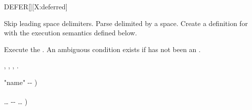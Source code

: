 \begin{worddef}{}{DEFER}[][X:deferred]
\item {}

	Skip leading space delimiters.  Parse  delimited by a
	space.  Create a definition for  with the execution
	semantics defined below.

\execute[name]

	Execute the  .
	An ambiguous condition exists if  has not been
	 an .

\see {},
	,
	,
	.

	\begin{implement} %
		\word{:}   "name" -{}- ) \\
		\tab {} \word{[']}  \word{,} \\
		  {\ldots} -{}- {\ldots} ) \\
		\tab {}  \word{;}
	\end{implement}

	\begin{testing} %
		 \\
		 \\

		 \\
	\end{testing}
\end{worddef}


